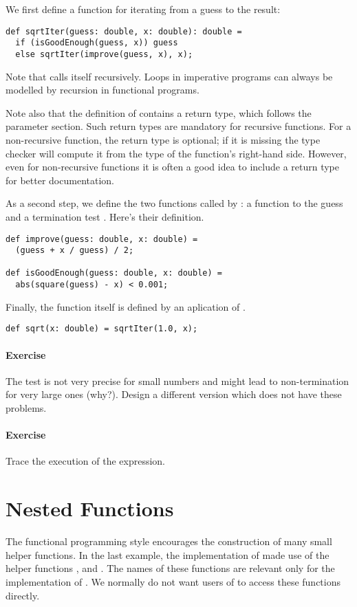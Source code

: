 \documentclass[a4paper,12pt,twoside,titlepage]{book}
\newcommand{\exercise}{\paragraph{Exercise}}
\begin{document}
We first define a function for iterating from a guess to the result:
\begin{lstlisting}
def sqrtIter(guess: double, x: double): double = 
  if (isGoodEnough(guess, x)) guess
  else sqrtIter(improve(guess, x), x);
\end{lstlisting}
Note that  calls itself recursively.  Loops in
imperative programs can always be modelled by recursion in functional
programs. 

Note also that the definition of  contains a return
type, which follows the parameter section. Such return types are
mandatory for recursive functions. For a non-recursive function, the
return type is optional; if it is missing the type checker will
compute it from the type of the function's right-hand side. However,
even for non-recursive functions it is often a good idea to include a
return type for better documentation.

As a second step, we define the two functions called by
: a function to  the guess and a
termination test . Here's their definition.
\begin{lstlisting}
def improve(guess: double, x: double) = 
  (guess + x / guess) / 2;

def isGoodEnough(guess: double, x: double) = 
  abs(square(guess) - x) < 0.001;
\end{lstlisting}

Finally, the  function itself is defined by an aplication
of .
\begin{lstlisting}
def sqrt(x: double) = sqrtIter(1.0, x);
\end{lstlisting}

\exercise The  test is not very precise for small numbers
and might lead to non-termination for very large ones (why?).
Design a different version  which does not have these problems.

\exercise Trace the execution of the  expression.

\section{Nested Functions}

The functional programming style encourages the construction of many
small helper functions. In the last example, the implementation
of  made use of the helper functions ,
 and . The names of these functions
are relevant only for the implementation of . We normally
do not want users of  to access these functions directly.
\end{document}
